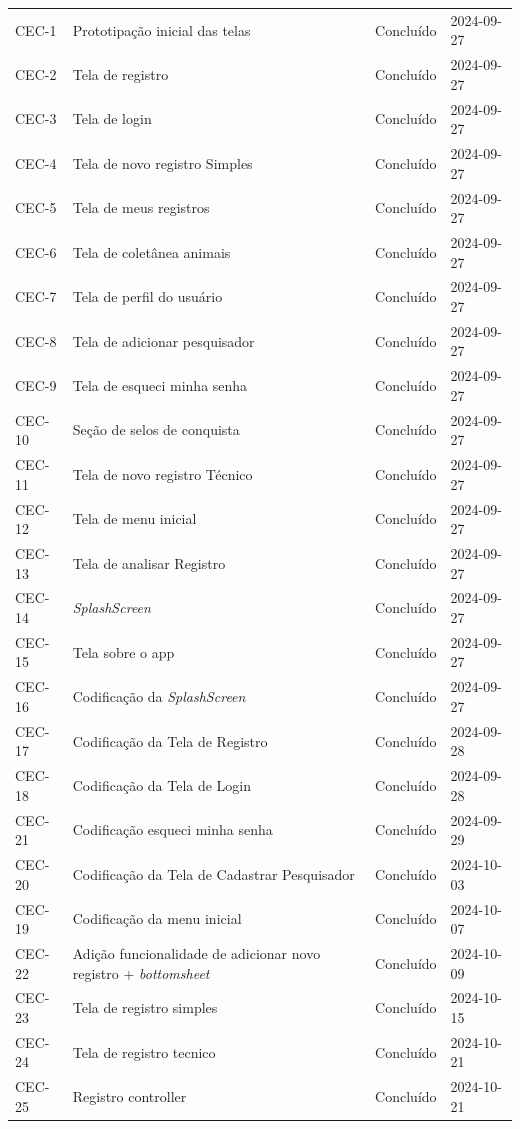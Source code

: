 \begin{longtable}{@{}lp{7cm}ll@{}}
CEC-1 & Prototipação inicial das telas & Concluído & 2024-09-27 \\
CEC-2 & Tela de registro & Concluído & 2024-09-27 \\
CEC-3 & Tela de login & Concluído & 2024-09-27 \\
CEC-4 & Tela de novo registro Simples & Concluído & 2024-09-27 \\
CEC-5 & Tela de meus registros & Concluído & 2024-09-27 \\
CEC-6 & Tela de coletânea animais & Concluído & 2024-09-27 \\
CEC-7 & Tela de perfil do usuário & Concluído & 2024-09-27 \\
CEC-8 & Tela de adicionar pesquisador & Concluído & 2024-09-27 \\
CEC-9 & Tela de esqueci minha senha & Concluído & 2024-09-27 \\
CEC-10 & Seção de selos de conquista & Concluído & 2024-09-27 \\
CEC-11 & Tela de novo registro Técnico & Concluído & 2024-09-27 \\
CEC-12 & Tela de menu inicial & Concluído & 2024-09-27 \\
CEC-13 & Tela de analisar Registro & Concluído & 2024-09-27 \\
CEC-14 & \textit{SplashScreen} & Concluído & 2024-09-27 \\
CEC-15 & Tela sobre o app & Concluído & 2024-09-27 \\
CEC-16 & Codificação da \textit{SplashScreen} & Concluído & 2024-09-27 \\
CEC-17 & Codificação da Tela de Registro & Concluído & 2024-09-28 \\
CEC-18 & Codificação da Tela de Login & Concluído & 2024-09-28 \\
CEC-21 & Codificação esqueci minha senha & Concluído & 2024-09-29 \\
CEC-20 & Codificação da Tela de Cadastrar Pesquisador & Concluído & 2024-10-03 \\
CEC-19 & Codificação da menu inicial & Concluído & 2024-10-07 \\
CEC-22 & Adição funcionalidade de adicionar novo registro + \textit{bottomsheet} & Concluído & 2024-10-09 \\
CEC-23 & Tela de registro simples & Concluído & 2024-10-15 \\
CEC-24 & Tela de registro tecnico & Concluído & 2024-10-21 \\
CEC-25 & Registro controller & Concluído & 2024-10-21 \\

\end{longtable}
